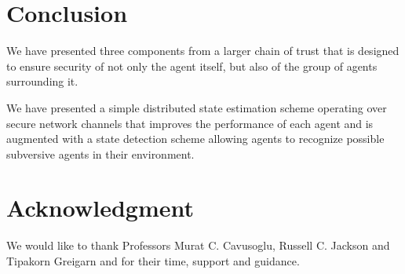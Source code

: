 \documentclass[conference]{IEEEtran}
\begin{document}
\section{Conclusion}
We have presented three components from a larger chain of trust that is designed to ensure security of not only the agent itself, but also of the group of agents surrounding it.

We have presented a simple distributed state estimation scheme operating over secure network channels that improves the performance of each agent and is augmented with a state detection scheme allowing agents to recognize possible subversive agents in their environment.

\section*{Acknowledgment}
We would like to thank Professors Murat C. Cavusoglu, Russell C. Jackson and Tipakorn Greigarn and for their time, support and guidance.

\printbibliography
\end{document}
